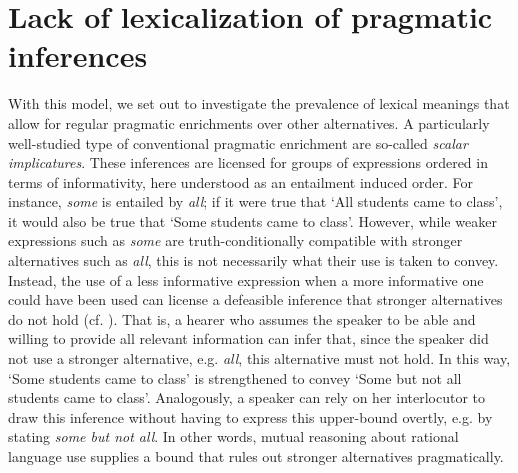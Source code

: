 \documentclass[a4paper]{article}
\newcommand{\tuple}[1]{\ensuremath{\left\langle #1 \right\rangle}}
\newcommand{\hl}[1]{\textcolor[rgb]{.8,.33,.0}{#1}}%
\begin{document}









\section{Lack of lexicalization of pragmatic inferences}

%
With this model, we set out to investigate the prevalence of lexical meanings that allow for regular pragmatic enrichments over other alternatives. A particularly well-studied type of conventional pragmatic enrichment are so-called {\em scalar implicatures}. These inferences are licensed for groups of expressions ordered in terms of informativity, here understood as an entailment induced order. For instance, {\em some} is entailed by {\em all}; if it were true that `All students came to class', it would also be true that `Some students came to class'. However, while weaker expressions such as {\em some} are truth-conditionally compatible with stronger alternatives such as {\em all}, this is not necessarily what their use is taken to convey. Instead, the use of a less informative expression when a more informative one could have been used can license a defeasible inference that stronger alternatives do not hold (cf. \citealt{horn:1972,gazdar:1979}). That is, a hearer who assumes the speaker to be able and willing to provide all relevant information can infer that, since the speaker did not use a stronger alternative, e.g. {\em all}, this alternative must not hold. In this way, `Some students came to class' is strengthened to convey `Some but not all students came to class'. Analogously, a speaker can rely on her interlocutor to draw this inference without having to express this upper-bound overtly, e.g. by stating {\em some but not all}. In other words, mutual reasoning about rational language use supplies a bound that rules out stronger alternatives pragmatically.
\end{document}
